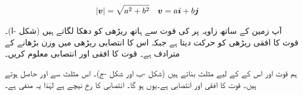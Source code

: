 \begin{align}
\abs{{{\boldsymbol{v}}}}&=\sqrt{a^2+b^2}&&{{\boldsymbol{v}}}=a{\boldsymbol{i}}+b{\boldsymbol{j}}
\end{align}

آپ زمین کے ساتھ  زاویہ پر  کی قوت  سے ہاتھ ریڑھی کو دھکا لگاتے ہیں (شکل -ا)۔ قوت کا افقی   ریڑھی کو حرکت دیتا ہے جبکہ اس کا انتصابی  ریڑھی میں  وزن بڑھانے کے مترادف  ہے۔  قوت کا افقی   اور انتصابی   معلوم کریں۔

ہم قوت  اور اس کے  کے لیے مثلث  بناتے ہیں (شکل -ب اور شکل -ج)۔ اس مثلث سے  اور  حاصل ہوتے ہیں۔ قوت کا افقی   اور انتصابی   ہے۔یوں  ہو گا۔  انتصابی  کا رخ نیچے ہے لہٰذا یہ منفی ہے۔ 
